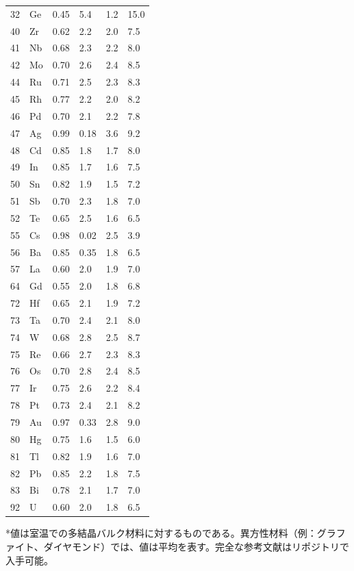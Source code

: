 \documentclass[11pt,a4paper]{article}
\theoremstyle{remark}
\begin{document}
\begin{longtable}{p{0.8cm}p{1.2cm}p{2.2cm}p{2.2cm}p{2.2cm}p{2.2cm}}
		32 & Ge & 0.45 & 5.4 & 1.2 & 15.0 \\
		40 & Zr & 0.62 & 2.2 & 2.0 & 7.5 \\
		41 & Nb & 0.68 & 2.3 & 2.2 & 8.0 \\
		42 & Mo & 0.70 & 2.6 & 2.4 & 8.5 \\
		44 & Ru & 0.71 & 2.5 & 2.3 & 8.3 \\
		45 & Rh & 0.77 & 2.2 & 2.0 & 8.2 \\
		46 & Pd & 0.70 & 2.1 & 2.2 & 7.8 \\
		47 & Ag & 0.99 & 0.18 & 3.6 & 9.2 \\
		48 & Cd & 0.85 & 1.8 & 1.7 & 8.0 \\
		49 & In & 0.85 & 1.7 & 1.6 & 7.5 \\
		50 & Sn & 0.82 & 1.9 & 1.5 & 7.2 \\
		51 & Sb & 0.70 & 2.3 & 1.8 & 7.0 \\
		52 & Te & 0.65 & 2.5 & 1.6 & 6.5 \\
		55 & Cs & 0.98 & 0.02 & 2.5 & 3.9 \\
		56 & Ba & 0.85 & 0.35 & 1.8 & 6.5 \\
		57 & La & 0.60 & 2.0 & 1.9 & 7.0 \\
		64 & Gd & 0.55 & 2.0 & 1.8 & 6.8 \\
		72 & Hf & 0.65 & 2.1 & 1.9 & 7.2 \\
		73 & Ta & 0.70 & 2.4 & 2.1 & 8.0 \\
		74 & W  & 0.68 & 2.8 & 2.5 & 8.7 \\
		75 & Re & 0.66 & 2.7 & 2.3 & 8.3 \\
		76 & Os & 0.70 & 2.8 & 2.4 & 8.5 \\
		77 & Ir & 0.75 & 2.6 & 2.2 & 8.4 \\
		78 & Pt & 0.73 & 2.4 & 2.1 & 8.2 \\
		79 & Au & 0.97 & 0.33 & 2.8 & 9.0 \\
		80 & Hg & 0.75 & 1.6 & 1.5 & 6.0 \\
		81 & Tl & 0.82 & 1.9 & 1.6 & 7.0 \\
		82 & Pb & 0.85 & 2.2 & 1.8 & 7.5 \\
		83 & Bi & 0.78 & 2.1 & 1.7 & 7.0 \\
		92 & U  & 0.60 & 2.0 & 1.8 & 6.5 \\
		\bottomrule
	\end{longtable}
	*値は室温での多結晶バルク材料に対するものである。異方性材料（例：グラファイト、ダイヤモンド）では、値は平均を表す。完全な参考文献はリポジトリで入手可能。
	
\end{document}
